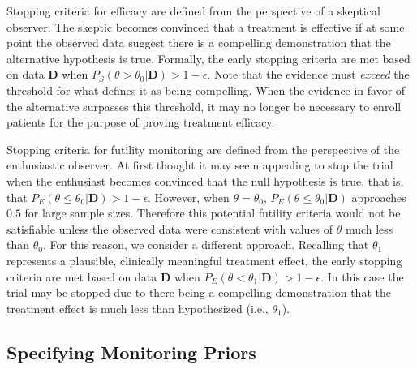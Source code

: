 \documentclass[12pt]{article}
\begin{document}
Stopping criteria for efficacy are defined from the perspective of a skeptical observer. 
The skeptic becomes convinced that a treatment is effective if at some point the observed data suggest there is 
a compelling demonstration that the alternative hypothesis is true. 
Formally, the early stopping criteria are met based on data $\mathbf{D}$ when $P_S(\theta>\theta_0|\mathbf{D})>1-\epsilon$.
Note that the evidence must \textit{exceed} the threshold for what defines it as being compelling.
When the evidence in favor of the alternative surpasses this threshold, it may no longer be necessary to 
enroll patients for the purpose of proving treatment efficacy.


Stopping criteria for futility monitoring are defined from the perspective of the enthusiastic observer. At first thought it may seem appealing to stop the trial when the enthusiast becomes convinced that the
null hypothesis is true, that is, that $P_E(\theta\leq\theta_0|\mathbf{D})>1-\epsilon$. 
%
However, when $\theta=\theta_0$, $P_E(\theta\le\theta_0| \mathbf{D})$ approaches $0.5$ for large sample sizes. 
%
Therefore this potential futility criteria would not be satisfiable unless the observed data were consistent with values of
$\theta$ much less than $\theta_0$.
%
For this reason, we consider a different approach.
%
Recalling that $\theta_1$ represents a plausible, clinically meaningful treatment effect, the early stopping criteria are met based on data $\mathbf{D}$ when $P_E\left(\theta<\theta_1| \mathbf{D}\right)>1-\epsilon$. In this case the trial may be stopped due to there being a compelling demonstration that the treatment effect is much less than hypothesized (i.e., $\theta_1$).
%
\subsection{Specifying Monitoring Priors}\label{sec:mps}
\end{document}

